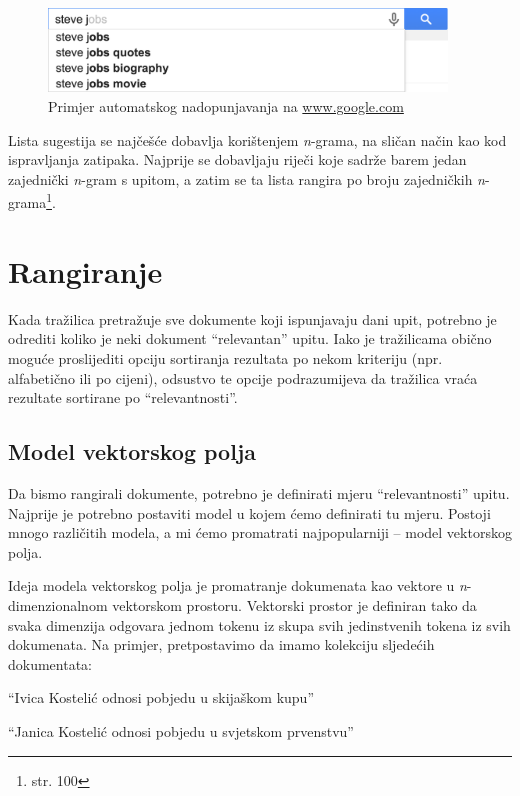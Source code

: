 \documentclass[a4paper,twoside,12pt]{scrreprt}
\begin{document}
\begin{figure}[H]
  \centering
  \includegraphics[width=300pt]{typeahead}
  \caption{Primjer automatskog nadopunjavanja na \url{www.google.com}}
  \label{typeahead}
\end{figure}

Lista sugestija se najčešće dobavlja korištenjem \textit{n}-grama, na sličan način kao kod ispravljanja zatipaka. Najprije se dobavljaju riječi koje sadrže barem jedan zajednički \textit{n}-gram s upitom, a zatim se ta lista rangira po broju zajedničkih \textit{n}-grama\footnote{\cite{taming} str. 100}.

\section{Rangiranje}

Kada tražilica pretražuje sve dokumente koji ispunjavaju dani upit, potrebno je odrediti koliko je neki dokument ``relevantan'' upitu. Iako je tražilicama obično moguće proslijediti opciju sortiranja rezultata po nekom kriteriju (npr. alfabetično ili po cijeni), odsustvo te opcije podrazumijeva da tražilica vraća rezultate sortirane po ``relevantnosti''.

\subsection{Model vektorskog polja}

Da bismo rangirali dokumente, potrebno je definirati mjeru ``relevantnosti'' upitu. Najprije je potrebno postaviti model u kojem ćemo definirati tu mjeru. Postoji mnogo različitih modela, a mi ćemo promatrati najpopularniji – model vektorskog polja.

Ideja modela vektorskog polja je promatranje dokumenata kao vektore u \textit{n}-dimenzionalnom vektorskom prostoru. Vektorski prostor je definiran tako da svaka dimenzija odgovara jednom tokenu iz skupa svih jedinstvenih tokena iz svih dokumenata. Na primjer, pretpostavimo da imamo kolekciju sljedećih dokumentata:

\begin{compactenum}
  \item ``Ivica Kostelić odnosi pobjedu u skijaškom kupu''
  \item ``Janica Kostelić odnosi pobjedu u svjetskom prvenstvu''
\end{compactenum}
\end{document}
